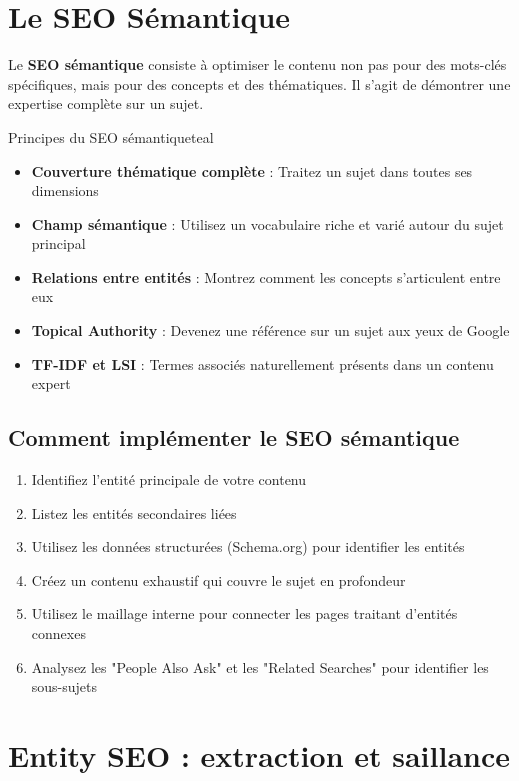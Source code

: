 \documentclass[12pt,a4paper,twoside]{report}
\newcommand{\keyword}[1]{\textbf{\textcolor{googleblue}{#1}}}
\begin{document}
\section{Le SEO Sémantique}

Le \keyword{SEO sémantique} consiste à optimiser le contenu non pas pour des mots-clés spécifiques, mais pour des concepts et des thématiques. Il s'agit de démontrer une expertise complète sur un sujet.

\begin{mybox}{Principes du SEO sémantique}{teal}
\begin{itemize}
    \item \textbf{Couverture thématique complète} : Traitez un sujet dans toutes ses dimensions
    \item \textbf{Champ sémantique} : Utilisez un vocabulaire riche et varié autour du sujet principal
    \item \textbf{Relations entre entités} : Montrez comment les concepts s'articulent entre eux
    \item \textbf{Topical Authority} : Devenez une référence sur un sujet aux yeux de Google
    \item \textbf{TF-IDF et LSI} : Termes associés naturellement présents dans un contenu expert
\end{itemize}
\end{mybox}

\subsection{Comment implémenter le SEO sémantique}

\begin{enumerate}
    \item Identifiez l'entité principale de votre contenu
    \item Listez les entités secondaires liées
    \item Utilisez les données structurées (Schema.org) pour identifier les entités
    \item Créez un contenu exhaustif qui couvre le sujet en profondeur
    \item Utilisez le maillage interne pour connecter les pages traitant d'entités connexes
    \item Analysez les "People Also Ask" et les "Related Searches" pour identifier les sous-sujets
\end{enumerate}

\section{Entity SEO : extraction et saillance}
\end{document}
